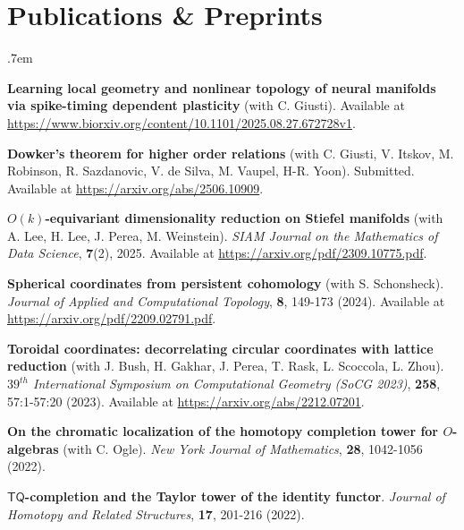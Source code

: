 \documentclass[10pt,letterpaper]{article}
\renewenvironment{itemize}{
  \begin{list}{}{
    \setlength{\leftmargin}{1.5em}
    \setlength{\itemsep}{0.25em}
    \setlength{\parskip}{0pt}
    \setlength{\parsep}{0.25em}
  }
}{
  \end{list}
}
\begin{document}
\section*{Publications \& Preprints}

\begin{itemize}\itemsep.7em

\item{\bf Learning local geometry and nonlinear topology of neural manifolds via spike-timing dependent plasticity} (with C. Giusti). Available at \url{https://www.biorxiv.org/content/10.1101/2025.08.27.672728v1}.

\item {\bf Dowker's theorem for higher order relations} (with C. Giusti, V. Itskov, M. Robinson, R. Sazdanovic, V. de Silva, M. Vaupel, H-R. Yoon). Submitted. Available at \url{https://arxiv.org/abs/2506.10909}.


\item{\bf $O(k)$-equivariant dimensionality reduction on Stiefel manifolds} (with A. Lee, H. Lee, J. Perea, M. Weinstein). \emph{SIAM Journal on the Mathematics of Data Science}, \textbf{7}(2), 2025. Available at \url{https://arxiv.org/pdf/2309.10775.pdf}.

\item {\bf Spherical coordinates from persistent cohomology} (with S. Schonsheck). \emph{Journal of Applied and Computational Topology}, \textbf{8}, 149-173 (2024). Available at \url{https://arxiv.org/pdf/2209.02791.pdf}.

\item{\bf Toroidal coordinates: decorrelating circular coordinates with lattice reduction} (with J. Bush, H. Gakhar, J. Perea, T. Rask, L. Scoccola, L. Zhou). \textit{$39^{th}$ International Symposium on Computational Geometry (SoCG 2023)}, \textbf{258},  57:1-57:20 (2023). Available at \url{https://arxiv.org/abs/2212.07201}.

\item{\bf On the chromatic localization of the homotopy completion tower for $O$-algebras} (with C. Ogle). \textit{New York Journal of Mathematics}, {\bf 28}, 1042-1056 (2022). 



\item{\bf $\mathsf{TQ}$-completion and the Taylor tower of the identity functor}. \textit{Journal of Homotopy and Related Structures}, \textbf{17}, 201-216 (2022). 


\end{itemize}
\end{document}

